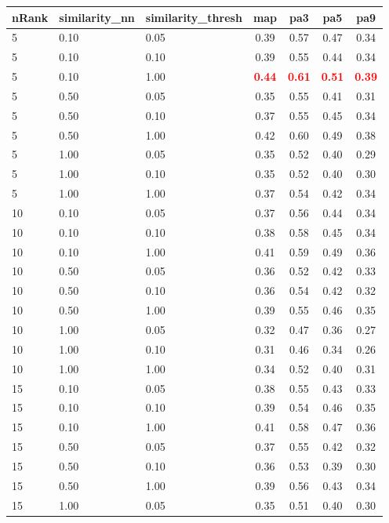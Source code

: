   
\begin{table} 
\begin{center} 
\scriptsize 
 \setlength{\tabcolsep}{.16667em} 
\begin{tabular}{lllcccc} 
nRank & similarity\_nn & similarity\_thresh & map & pa3 & pa5 & pa9 \\ 
\hline 
 5 & 0.10 & 0.05 & 0.39 & 0.57 & 0.47 & 0.34 \\ 
 5 & 0.10 & 0.10 & 0.39 & 0.55 & 0.44 & 0.34 \\ 
 5 & 0.10 & 1.00 & \textbf{\textcolor{red}{0.44}} & \textbf{\textcolor{red}{0.61}} & \textbf{\textcolor{red}{0.51}} & \textbf{\textcolor{red}{0.39}} \\ 
 5 & 0.50 & 0.05 & 0.35 & 0.55 & 0.41 & 0.31 \\ 
 5 & 0.50 & 0.10 & 0.37 & 0.55 & 0.45 & 0.34 \\ 
 5 & 0.50 & 1.00 & 0.42 & 0.60 & 0.49 & 0.38 \\ 
 5 & 1.00 & 0.05 & 0.35 & 0.52 & 0.40 & 0.29 \\ 
 5 & 1.00 & 0.10 & 0.35 & 0.52 & 0.40 & 0.30 \\ 
 5 & 1.00 & 1.00 & 0.37 & 0.54 & 0.42 & 0.34 \\ 
10 & 0.10 & 0.05 & 0.37 & 0.56 & 0.44 & 0.34 \\ 
10 & 0.10 & 0.10 & 0.38 & 0.58 & 0.45 & 0.34 \\ 
10 & 0.10 & 1.00 & 0.41 & 0.59 & 0.49 & 0.36 \\ 
10 & 0.50 & 0.05 & 0.36 & 0.52 & 0.42 & 0.33 \\ 
10 & 0.50 & 0.10 & 0.36 & 0.54 & 0.42 & 0.32 \\ 
10 & 0.50 & 1.00 & 0.39 & 0.55 & 0.46 & 0.35 \\ 
10 & 1.00 & 0.05 & 0.32 & 0.47 & 0.36 & 0.27 \\ 
10 & 1.00 & 0.10 & 0.31 & 0.46 & 0.34 & 0.26 \\ 
10 & 1.00 & 1.00 & 0.34 & 0.52 & 0.40 & 0.31 \\ 
15 & 0.10 & 0.05 & 0.38 & 0.55 & 0.43 & 0.33 \\ 
15 & 0.10 & 0.10 & 0.39 & 0.54 & 0.46 & 0.35 \\ 
15 & 0.10 & 1.00 & 0.41 & 0.58 & 0.47 & 0.36 \\ 
15 & 0.50 & 0.05 & 0.37 & 0.55 & 0.42 & 0.32 \\ 
15 & 0.50 & 0.10 & 0.36 & 0.53 & 0.39 & 0.30 \\ 
15 & 0.50 & 1.00 & 0.39 & 0.56 & 0.43 & 0.34 \\ 
15 & 1.00 & 0.05 & 0.35 & 0.51 & 0.40 & 0.30 \\ 

\end{tabular}
\end{center}
\end{table}
